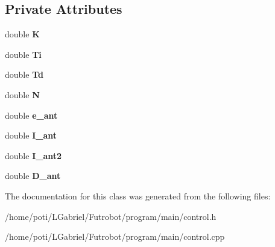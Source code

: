 \subsection*{Private Attributes}
\begin{DoxyCompactItemize}
\item 
double {\bfseries K}\hypertarget{classPID_a0b7cf5ad8d3913f6dc570d0917fa1fd3}{}\label{classPID_a0b7cf5ad8d3913f6dc570d0917fa1fd3}

\item 
double {\bfseries Ti}\hypertarget{classPID_a7cd57cae8a9e785849b6af11f699afab}{}\label{classPID_a7cd57cae8a9e785849b6af11f699afab}

\item 
double {\bfseries Td}\hypertarget{classPID_a6d3306e34c941e0a0858c7d9844ad34a}{}\label{classPID_a6d3306e34c941e0a0858c7d9844ad34a}

\item 
double {\bfseries N}\hypertarget{classPID_a34936ba6f1b26cd6c60773aa34841bd9}{}\label{classPID_a34936ba6f1b26cd6c60773aa34841bd9}

\item 
double {\bfseries e\+\_\+ant}\hypertarget{classPID_a5af4850d2b9805162a61a28a8cdc87a9}{}\label{classPID_a5af4850d2b9805162a61a28a8cdc87a9}

\item 
double {\bfseries I\+\_\+ant}\hypertarget{classPID_af4d41ac42aa266a220abbf8aad2a8729}{}\label{classPID_af4d41ac42aa266a220abbf8aad2a8729}

\item 
double {\bfseries I\+\_\+ant2}\hypertarget{classPID_ad2950541273773b5a13fc7f564b27fb3}{}\label{classPID_ad2950541273773b5a13fc7f564b27fb3}

\item 
double {\bfseries D\+\_\+ant}\hypertarget{classPID_a9f136f735fe624e11ec7017e3e17a6a6}{}\label{classPID_a9f136f735fe624e11ec7017e3e17a6a6}

\end{DoxyCompactItemize}


The documentation for this class was generated from the following files\+:\begin{DoxyCompactItemize}
\item 
/home/poti/\+L\+Gabriel/\+Futrobot/program/main/control.\+h\item 
/home/poti/\+L\+Gabriel/\+Futrobot/program/main/control.\+cpp\end{DoxyCompactItemize}
